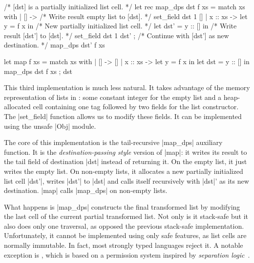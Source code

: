\begin{minipage}{0.65\linewidth}
\begin{OCaml}
/* [dst] is a partially initialized list cell. */
let rec map_dps dst f xs =
  match xs with
  | [] ->
      /* Write result empty list to [dst]. */
      set_field dst 1 []
  | x :: xs ->
      let y = f x in
      /* New partially initialized list cell. */
      let dst' = y :: [] in
      /* Write result [dst'] to [dst]. */
      set_field dst 1 dst' ;
      /* Continue with [dst'] as new destination. */
      map_dps dst' f xs
\end{OCaml}
\end{minipage}
\hfill
\begin{minipage}{0.45\linewidth}
\begin{OCaml}
let map f xs =
  match xs with
  | [] ->
      []
  | x :: xs ->
      let y = f x in
      let dst = y :: [] in
      map_dps dst f xs ;
      dst
\end{OCaml}
\end{minipage}

This third implementation is much less natural.
%
It takes advantage of the memory representation of lists in \OCamlLang: some constant integer for the empty list and a heap-allocated cell containing one tag followed by two fields for the list constructor.
%
The \ocaml|set_field| function allows us to modify these fields.
%
It can be implemented using the unsafe \ocaml|Obj| module.

The core of this implementation is the tail-recursive \ocaml|map_dps| auxiliary function.
%
It is the \emph{destination-passing style} version of \ocaml|map|: it writes its result to the tail field of destination \ocaml|dst| instead of returning it.
%
On the empty list, it just writes the empty list.
%
On non-empty lists, it allocates a new partially initialized list cell \ocaml|dst'|, writes \ocaml|dst'| to \ocaml|dst| and calls itself recursively with \ocaml|dst|' as its new destination.
%
\ocaml|map| calls \ocaml|map_dps| on non-empty lists.

What happens is \ocaml|map_dps| constructs the final transformed list by modifying the last cell of the current partial transformed list.
%
Not only is it stack-safe but it also does only one traversal, as opposed the previous stack-safe implementation.
%
Unfortunately, it cannot be implemented using only safe \OCamlLang features, as list cells are normally immutable.
%
In fact, most strongly typed languages reject it.
%
A notable exception is \MezzoLang \cite{DBLP:journals/toplas/BalabonskiPP16}, which is based on a permission system inspired by \emph{separation logic}~\cite{DBLP:journals/cacm/OHearn19}.

